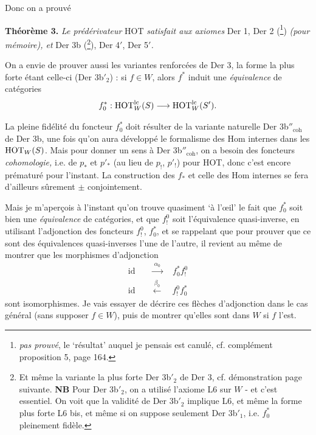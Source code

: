 Donc on a prouvé

\textbf{Théorème 3.} \textit{Le prédérivateur} HOT \textit{satisfait aux axiomes} Der 1, Der 2 (\footnote[76]{\textit{pas prouvé}, le ‘résultat’ auquel je pensais est canulé, cf. complément proposition 5, page 164.}) \textit{(pour mémoire), et} Der 3b (\footnote[77]{Et même la variante la plus forte Der 3b$'_2$ de Der 3, cf. démonstration page suivante. \textbf{NB} Pour Der 3b$'_2$, on a utilisé l'axiome L6 sur $W$ - et c'est essentiel. On voit que la validité de Der 3b$'_2$ implique L6, et même la forme plus forte L6 bis, et même si on suppose seulement Der 3b$'_1$, i.e. $f_0^*$ pleinement fidèle.}), Der 4$'$, Der 5$'$\textit{.} %

On a envie de prouver aussi les variantes renforcées de Der 3, la forme la plus forte étant celle-ci (Der 3b$'_2$) : si $f\in W$, alors $f^*$ induit une \textit{équivalence} de catégories
\[f_0^* : \mathrm{HOT}^{\mathrm{lc}}_W(S)\longrightarrow\mathrm{HOT}^{\mathrm{lc}}_W(S').\]

La pleine fidélité du foncteur $f_0^*$ doit résulter de la variante naturelle Der 3b$''_{\mathrm{coh}}$ de Der 3b, une fois qu'on aura développé le formalisme des Hom internes dans les $\mathrm{HOT}_W(S)$. Mais pour donner un sens à Der 3b$''_{\mathrm{coh}}$, on a besoin des foncteurs \textit{cohomologie,} i.e. de $p_*$ et $p'_*$ (au lieu de $p_!$, $p'_!$) pour HOT, donc c'est encore prématuré pour l'instant. La construction des $f_*$ et celle des Hom internes se fera d'ailleurs sûrement $\pm$ conjointement.

Mais je m'aperçois à l'instant qu'on trouve quasiment ‘à l'œil’ le fait que $f_0^*$ soit bien une \textit{équivalence} de catégories, et que $f_!^0$ soit l'équivalence quasi-inverse, en utilisant l'adjonction des foncteurs $f_!^0$, $f_0^*$, et se rappelant que pour prouver que ce sont des équivalences quasi-inverses l'une de l'autre, il revient au même de montrer que les morphismes d'adjonction
\[\begin{aligned}
\mathrm{id}&\quad\xrightarrow{\ \alpha_0\ }\quad f_0^*f_!^0\\
\mathrm{id}&\quad\xleftarrow{\ \beta_0\ }\quad f_!^0f_0^*
\end{aligned}\]
sont isomorphismes. Je vais essayer de décrire ces flèches d'adjonction dans le cas général (sans supposer $f\in W$), puis de montrer qu'elles sont dans $W$ si $f$ l'est.


